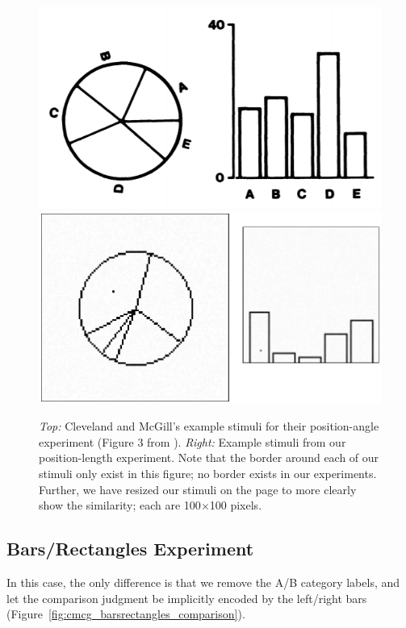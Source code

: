 \documentclass[journal]{vgtc}        %
\newcommand{\change}[1]{{#1}}
\begin{document}
\begin{figure}[tb]
    \centering
    \includegraphics[width=0.75\linewidth,trim=-1cm 0 0 0, clip]{./gfx/CMcG_Comparison/CMcG_PositionAngle.png}\\
    \includegraphics[width=0.72\linewidth]{./gfx/CMcG_Comparison/Ours_PositionAngle.pdf}
    \caption{\emph{Top:} Cleveland and McGill's example stimuli for their position-angle experiment (Figure 3 from \cite{cleveland_mcgill}). \emph{Right:} Example stimuli from our position-length experiment. Note that the border around each of our stimuli only exist in this figure; no border exists in our experiments. Further, we have resized our stimuli on the page to more clearly show the similarity; each are 100$\times$100 pixels.}
    \label{fig:cmcg_positionangle_comparison}
\end{figure}

\subsection{Bars/Rectangles Experiment}

\change{
In this case, the only difference is that we remove the A/B category labels, and let the comparison judgment be implicitly encoded by the left/right bars (Figure~\ref{fig:cmcg_barsrectangles_comparison}).
}
\end{document}

